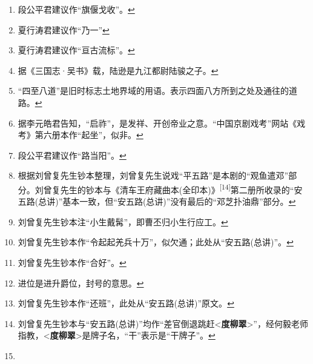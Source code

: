 \begin{enumerate}
\item
  \leavevmode\hypertarget{fn214}{}%
  段公平君建议作``旗偃戈收''。\protect\hyperlink{fnref214}{↩}
\item
  \leavevmode\hypertarget{fn215}{}%
  夏行涛君建议作``乃一''\protect\hyperlink{fnref215}{↩}
\item
  \leavevmode\hypertarget{fn216}{}%
  夏行涛君建议作``亘古流标''。\protect\hyperlink{fnref216}{↩}
\item
  \leavevmode\hypertarget{fn217}{}%
  据《三国志·吴书》载，陆逊是九江都尉陆骏之子。\protect\hyperlink{fnref217}{↩}
\item
  \leavevmode\hypertarget{fn218}{}%
  ``四至八道''是旧时标志土地界域的用语。表示四面八方所到之处及通往的道路。\protect\hyperlink{fnref218}{↩}
\item
  \leavevmode\hypertarget{fn219}{}%
  据李元皓君告知，``启祚''，是发祥、开创帝业之意。``中国京剧戏考''网站《戏考》第六册本作``起坐''，似非。\protect\hyperlink{fnref219}{↩}
\item
  \leavevmode\hypertarget{fn220}{}%
  段公平君建议作``路当阳''。\protect\hyperlink{fnref220}{↩}
\item
  \leavevmode\hypertarget{fn221}{}%
  根据刘曾复先生钞本整理，刘曾复先生说戏``平五路''是本剧的``观鱼遣邓''部分。刘曾复先生的钞本与《清车王府藏曲本(全印本)》\textsuperscript{{[}14{]}}第二册所收录的``安五路(总讲)''基本一致，但``安五路(总讲)''没有最后的``邓芝扑油鼎''部分。\protect\hyperlink{fnref221}{↩}
\item
  \leavevmode\hypertarget{fn222}{}%
  刘曾复先生钞本注``小生戴髯''，即曹丕归小生行应工。\protect\hyperlink{fnref222}{↩}
\item
  \leavevmode\hypertarget{fn223}{}%
  刘曾复先生钞本作``令起起羌兵十万''，似欠通；此处从``安五路(总讲)''。\protect\hyperlink{fnref223}{↩}
\item
  \leavevmode\hypertarget{fn224}{}%
  刘曾复先生钞本作``合好''。\protect\hyperlink{fnref224}{↩}
\item
  \leavevmode\hypertarget{fn225}{}%
  进位是进升爵位，封号的意思。\protect\hyperlink{fnref225}{↩}
\item
  \leavevmode\hypertarget{fn226}{}%
  刘曾复先生钞本作``还班''，此处从``安五路(总讲)''原文。\protect\hyperlink{fnref226}{↩}
\item
  \leavevmode\hypertarget{fn227}{}%
  刘曾复先生钞本与``安五路(总讲)''均作``差官倒退跳赶\textless{}\textbf{度柳翠}\textgreater{}''，经何毅老师指教，\textless{}\textbf{度柳翠}\textgreater{}是牌子名，``干''表示是``干牌子''。\protect\hyperlink{fnref227}{↩}
\item

\end{enumerate}
